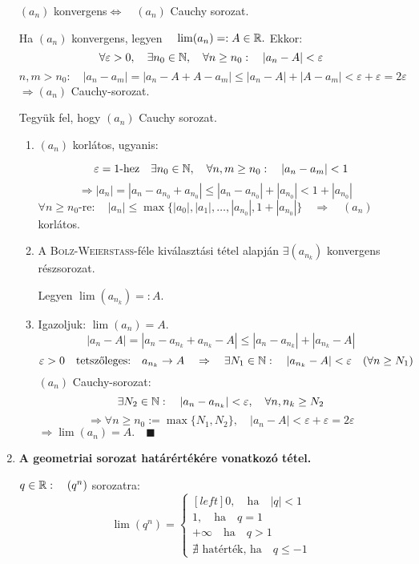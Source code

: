 \documentclass[a4paper,11.5pt]{article}
\begin{document}
\begin{enumerate}
		$(a_n)$ konvergens\quad  $\Leftrightarrow\quad (a_n)$ Cauchy sorozat.
		
		\biz 
		
		\fbox{$\Rightarrow$:}
		
		Ha $(a_n)$ konvergens, legyen $  \quad \lim(a_n)=:A\in\mathbb{R}.$ \quad Ekkor:
		\[ \forall \varepsilon>0,\quad  \exists n_0\in\mathbb{N},\quad \forall n\geq n_0:\quad |a_n-A|<\varepsilon \]
		\[ n,m>n_0:\quad  |a_n-a_m| = |a_n-A+A-a_m|\leq|a_n-A|+|A-a_m|<\varepsilon+\varepsilon=2\varepsilon \]
		$\Rightarrow (a_n)$ Cauchy-sorozat.
		
		\fbox{$\Leftarrow$:}
		
		Tegyük fel, hogy $(a_n)$ Cauchy sorozat.
		\begin{enumerate}
			\item $(a_n)$ korlátos, ugyanis:
			
			\[ \varepsilon=1\text{-hez}\quad \exists n_0\in\mathbb{N},\quad \forall n,m\geq n_0:\quad |a_n-a_m|<1 \]
			\[ \Rightarrow|a_n|=|a_n-a_{n_0}+a_{n_0}|\leq|a_n-a_{n_0}|+|a_{n_0}|<1+|a_{n_0}|\quad  \]
			$\forall n\geq n_0\text{-re}:\quad |a_n|\leq\max\{ |a_0|,|a_1|,\ldots,|a_{n_0}|,1+|a_{n_0}| \}\quad \Rightarrow\quad (a_n)$ korlátos.
			
			\smallskip
			\item A \textsc{Bolz-Weierstass}-féle kiválasztási tétel alapján $\exists(a_{n_k})$ konvergens részsorozat. 
			
			Legyen $\lim(a_{n_k})=:A$.
			
			\smallskip
			\item Igazoljuk: $\lim(a_n)=A$.
			\[|a_n-A|=|a_n-a_{n_k}+a_{n_k}-A|\leq|a_n-a_{n_k}|+|a_{n_k}-A| \]
			\[ \varepsilon>0 \text{\quad tetszőleges:\quad }  a_{n_k}\to A\quad \Rightarrow\quad \exists N_1\in\mathbb{N}:\quad |a_{n_k}-A|<\varepsilon \quad (\forall n\geq N_1) \]
			$(a_n)$ Cauchy-sorozat:
			\[ \exists N_2\in\mathbb{N}:\quad |a_n-a_{n_k}|<\varepsilon,\quad \forall n,n_k \geq N_2 \]
			\[ \Rightarrow\forall n\geq n_0:=\max\{ N_1,N_2 \}, \quad |a_n-A|<\varepsilon+\varepsilon=2\varepsilon \]
			$\Rightarrow \lim(a_n)=A.\quad \blacksquare$
		\end{enumerate}
		
		\item \textbf{A geometriai sorozat határértékére vonatkozó tétel.}
		
		$q\in\mathbb{R}:\quad (q^n)$ sorozatra:
		\[ \lim(q^n)=\left\{\begin{gathered}[left]
		0,\quad \text{ha}\quad |q|<1\\
		1,\quad \text{ha}\quad q=1\\
		+\infty\quad \text{ha}\quad q>1\\
		\nexists\text{ hatérték, ha}\quad q\leq-1
		\end{gathered}\right. \]
		

\end{enumerate}
\end{document}
